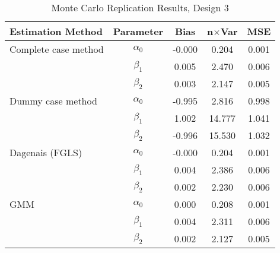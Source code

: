 \begin{table}
\centering
\caption{Monte Carlo Replication Results, Design 3}
\label{table:MCReplicationResultsDesign3}
\begin{tabular}{lcccc}
\toprule
Estimation Method & Parameter & Bias & n$\times$Var & MSE \\
\midrule
Complete case method & $\alpha_0$ & -0.000 & 0.204 & 0.001 \\
 & $\beta_1$ & 0.005 & 2.470 & 0.006 \\
 & $\beta_2$ & 0.003 & 2.147 & 0.005 \\
Dummy case method & $\alpha_0$ & -0.995 & 2.816 & 0.998 \\
 & $\beta_1$ & 1.002 & 14.777 & 1.041 \\
 & $\beta_2$ & -0.996 & 15.530 & 1.032 \\
Dagenais (FGLS) & $\alpha_0$ & -0.000 & 0.204 & 0.001 \\
 & $\beta_1$ & 0.004 & 2.386 & 0.006 \\
 & $\beta_2$ & 0.002 & 2.230 & 0.006 \\
GMM & $\alpha_0$ & 0.000 & 0.208 & 0.001 \\
 & $\beta_1$ & 0.004 & 2.311 & 0.006 \\
 & $\beta_2$ & 0.002 & 2.127 & 0.005 \\
\bottomrule
\end{tabular}
\end{table}
